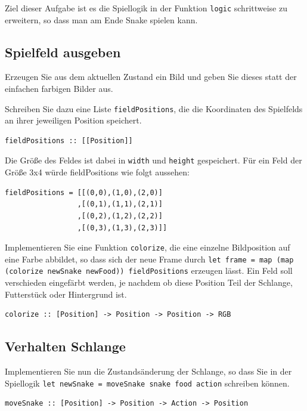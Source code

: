 \documentclass{scrartcl}
\begin{document}
Ziel dieser Aufgabe ist es die Spiellogik in der Funktion \texttt{logic} schrittweise zu erweitern, so dass man am Ende Snake spielen kann.

\subsection{Spielfeld ausgeben}
Erzeugen Sie aus dem aktuellen Zustand ein Bild und geben Sie dieses statt der einfachen farbigen Bilder aus.

Schreiben Sie dazu eine Liste \texttt{fieldPositions}, die die Koordinaten des Spielfelds an ihrer jeweiligen Position speichert.

\begin{lstlisting}
fieldPositions :: [[Position]]
\end{lstlisting}

Die Größe des Feldes ist dabei in \texttt{width} und \texttt{height} gespeichert.
Für ein Feld der Größe 3x4 würde fieldPositions wie folgt aussehen:

\begin{lstlisting}
fieldPositions = [[(0,0),(1,0),(2,0)]
                 ,[(0,1),(1,1),(2,1)]
                 ,[(0,2),(1,2),(2,2)]
                 ,[(0,3),(1,3),(2,3)]]
\end{lstlisting}

Implementieren Sie eine Funktion \texttt{colorize}, die eine einzelne Bildposition auf eine Farbe abbildet, so dass sich der neue Frame durch \texttt{let frame = map (map (colorize newSnake newFood)) fieldPositions} erzeugen lässt.
Ein Feld soll verschieden eingefärbt werden, je nachdem ob diese Position Teil der Schlange, Futterstück oder Hintergrund ist.

\begin{lstlisting}
colorize :: [Position] -> Position -> Position -> RGB
\end{lstlisting}

\subsection{Verhalten Schlange}
Implementieren Sie nun die Zustandsänderung der Schlange, so dass Sie in der Spiellogik \texttt{let newSnake = moveSnake snake food action} schreiben können.

\begin{lstlisting}
moveSnake :: [Position] -> Position -> Action -> Position
\end{lstlisting}
\end{document}
